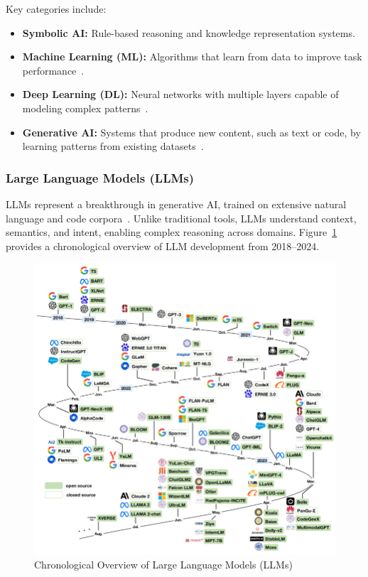 \begin{spacing}{1.2}
Key categories include:

\begin{itemize}
\item \textbf{Symbolic AI:} Rule-based reasoning and knowledge representation systems.
\item \textbf{Machine Learning (ML):} Algorithms that learn from data to improve task performance~\cite{ml2024definition}.
\item \textbf{Deep Learning (DL):} Neural networks with multiple layers capable of modeling complex patterns~\cite{dl2024definition}.
\item \textbf{Generative AI:} Systems that produce new content, such as text or code, by learning patterns from existing datasets~\cite{generative_ai2024}.
\end{itemize}

\subsubsection{Large Language Models (LLMs)}
LLMs represent a breakthrough in generative AI, trained on extensive natural language and code corpora~\cite{llm2024breakthrough}. Unlike traditional tools, LLMs understand context, semantics, and intent, enabling complex reasoning across domains. Figure~\ref{fig:llm_overview} provides a chronological overview of LLM development from 2018–2024.

\begin{figure}[H]
\centering
\includegraphics[scale=1]{Images/A-chronological-overview-of-large-language-models-LLMs-multimodal-and-scientific.png}
\caption{Chronological Overview of Large Language Models (LLMs)}
\label{fig:llm_overview}
\end{figure}


\end{spacing}
